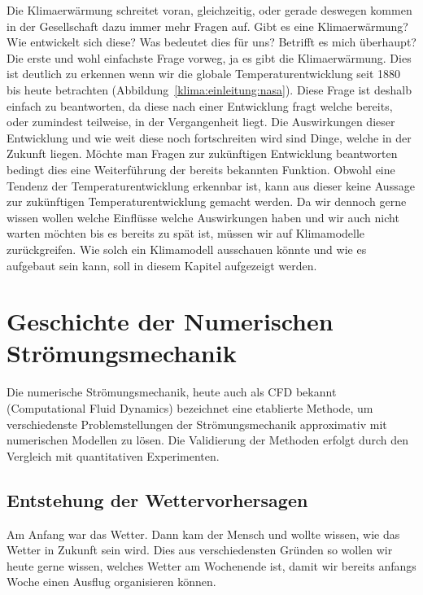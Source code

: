 \begin{refsection}
Die Klimaerwärmung schreitet voran, gleichzeitig, oder gerade deswegen kommen in der Gesellschaft dazu immer mehr Fragen auf. Gibt es eine Klimaerwärmung? Wie entwickelt sich diese? Was bedeutet dies für uns? Betrifft es mich überhaupt? Die erste und wohl einfachste Frage vorweg, ja es gibt die Klimaerwärmung. Dies ist deutlich zu erkennen wenn wir die globale Temperaturentwicklung seit 1880 bis heute betrachten (Abbildung~\ref{klima:einleitung:nasa}). Diese Frage ist deshalb einfach zu beantworten, da diese nach einer Entwicklung fragt welche bereits, oder zumindest teilweise, in der Vergangenheit liegt. Die Auswirkungen dieser Entwicklung und wie weit diese noch fortschreiten wird sind Dinge, welche in der Zukunft liegen. Möchte man Fragen zur zukünftigen Entwicklung beantworten bedingt dies eine Weiterführung der bereits bekannten Funktion. Obwohl eine Tendenz der Temperaturentwicklung erkennbar ist, kann aus dieser keine Aussage zur zukünftigen Temperaturentwicklung gemacht werden. Da wir dennoch gerne wissen wollen welche Einflüsse welche Auswirkungen haben und wir auch nicht warten möchten bis es bereits zu spät ist, müssen wir auf Klimamodelle zurückgreifen. Wie solch ein Klimamodell ausschauen könnte und wie es aufgebaut sein kann, soll in diesem Kapitel aufgezeigt werden.



\section{Geschichte der Numerischen Strömungsmechanik
\label{klima:section:geschichte}}
Die numerische Strömungsmechanik, heute auch als CFD bekannt (Computational Fluid Dynamics) bezeichnet eine etablierte Methode, um verschiedenste Problemstellungen der Strömungsmechanik approximativ mit numerischen Modellen zu lösen. Die Validierung der Methoden erfolgt durch den Vergleich mit quantitativen Experimenten.



\subsection{Entstehung der Wettervorhersagen
\label{klima:subsection:wetter}}
Am Anfang war das Wetter. Dann kam der Mensch und wollte wissen, wie das Wetter in Zukunft sein wird. Dies aus verschiedensten Gründen so wollen wir heute gerne wissen, welches Wetter am Wochenende ist, damit wir bereits anfangs Woche einen Ausflug organisieren können.


\end{refsection}
